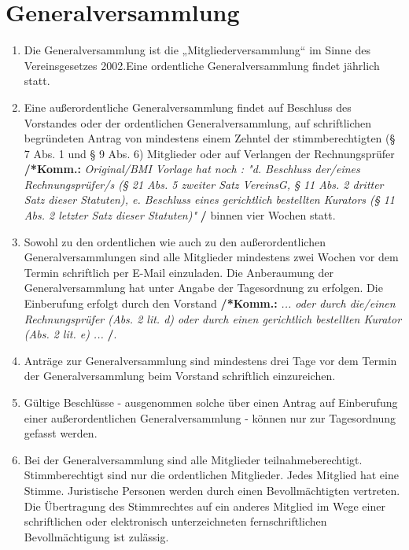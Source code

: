 \documentclass[a4paper,12pt]{article}
\newcommand{\comment}[1]{{\bf /*Komm.:} \textit{#1} {\bf */}}
\begin{document}
\section{Generalversammlung} %
\begin{enumerate}

\item Die Generalversammlung ist die „Mitgliederversammlung“ im Sinne des Vereinsgesetzes 2002.Eine ordentliche Generalversammlung findet jährlich statt.

\item Eine außerordentliche Generalversammlung findet 
auf Beschluss des Vorstandes oder der ordentlichen Generalversammlung,
auf schriftlichen begründeten Antrag von mindestens einem Zehntel der stimmberechtigten (§ 7 Abs. 1 und § 9 Abs. 6) Mitglieder
oder auf Verlangen der Rechnungsprüfer 
\comment{Original/BMI Vorlage hat noch : "d. Beschluss der/eines Rechnungsprüfer/s (§ 21 Abs. 5 zweiter Satz VereinsG, § 11 Abs. 2 dritter Satz dieser Statuten),
e. Beschluss eines gerichtlich bestellten Kurators (§ 11 Abs. 2 letzter Satz dieser Statuten)"}
binnen vier Wochen statt.

\item Sowohl zu den ordentlichen wie auch zu den außerordentlichen Generalversammlungen sind alle Mitglieder mindestens zwei Wochen vor dem Termin schriftlich per E-Mail einzuladen. Die Anberaumung der Generalversammlung hat unter Angabe der Tagesordnung zu erfolgen. Die Einberufung erfolgt durch den Vorstand \comment{... oder durch die/einen Rechnungsprüfer (Abs. 2 lit. d) oder durch einen gerichtlich bestellten Kurator (Abs. 2 lit. e) ...}.

\item Anträge zur Generalversammlung sind mindestens drei Tage vor dem Termin der Generalversammlung beim Vorstand schriftlich einzureichen.

\item Gültige Beschlüsse - ausgenommen solche über einen Antrag auf Einberufung einer außerordentlichen Generalversammlung - können nur zur Tagesordnung gefasst werden.

\item Bei der Generalversammlung sind alle Mitglieder teilnahmeberechtigt.
Stimmberechtigt sind nur die ordentlichen Mitglieder.
Jedes Mitglied hat eine Stimme.
Juristische Personen werden durch einen Bevollmächtigten vertreten.
Die Übertragung des Stimmrechtes auf ein anderes Mitglied im Wege einer schriftlichen oder elektronisch unterzeichneten fernschriftlichen Bevollmächtigung ist zulässig.


\end{enumerate}
\end{document}
